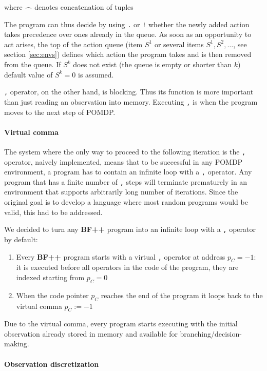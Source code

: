where $\frown$ denotes concatenation of tuples

The program can thus decide by using \texttt{.} or \texttt{!} whether the newly added action takes precedence over ones already in the queue.
As soon as an opportunity to act arises, the top of the action queue (item $S^1$ or several items $S^1,S^2,\dots$, see section \ref{sec:envs}) defines which action the program takes and is then removed from the queue. 
If $S^k$ does not exist (the queue is empty or shorter than $k$) default value of $S^k=0$ is assumed.

\texttt{,} operator, on the other hand, is blocking. 
Thus its function is more important than just reading an observation into memory.
Executing \texttt{,} is when the program moves to the next step of POMDP.

\paragraph{Virtual comma}
\label{sec:virtualcomma}


The system where the only way to proceed to the following iteration is the \texttt{,} operator, naively implemented, means that to be successful in any POMDP environment, a program has to contain an infinite loop with a \texttt{,} operator.
Any program that has a finite number of \texttt{,} steps will terminate prematurely in an environment that supports arbitrarily long number of iterations.
Since the original goal is to develop a language where most random programs would be valid, this had to be addressed.

We decided to turn any \textbf{BF++} program into an infinite loop with a \texttt{,} operator by default:
\begin{enumerate}
    \item Every \textbf{BF++} program starts with a virtual \texttt{,} operator at address $p_C = -1$: it is executed before all operators in the code of the program, they are indexed starting from $p_C = 0$
    \item When the code pointer $p_C$ reaches the end of the program it loops back to the virtual comma $p_C := -1$
\end{enumerate}

Due to the virtual comma, every program starts executing with the initial observation already stored in memory and available for branching/decision-making.

\paragraph{Observation discretization}
\label{sec:observe}

